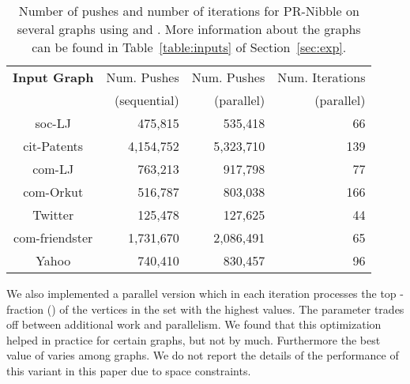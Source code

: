 {\begin{table}
\small
\centering
\begin{tabular}[!t]{c|r|r|r}
{\bf Input Graph} & Num. Pushes & Num. Pushes & Num. Iterations\\
& (sequential) & (parallel) & (parallel) \\
\hline
soc-LJ & 475,815  & 535,418 & 66 \\
cit-Patents & 4,154,752 & 5,323,710 & 139\\
com-LJ & 763,213 & 917,798 & 77\\
com-Orkut & 516,787  & 803,038 & 166 \\
Twitter & 125,478 & 127,625 & 44\\
com-friendster & 1,731,670 & 2,086,491 & 65\\
Yahoo & 740,410 & 830,457& 96 \\
\end{tabular}
\caption{Number of pushes and number of iterations for PR-Nibble on
  several graphs using  and . More
  information about the graphs can be found in
  Table~\ref{table:inputs} of
  Section~\ref{sec:exp}.}\label{table:pr-nibble}
\end{table}
}

We also implemented a parallel version which in each iteration
processes the top -fraction () of the vertices
in the set  with the highest
 values. The  parameter trades off between additional work
and parallelism.  We found that this optimization helped in practice
for certain graphs, but not by much. Furthermore the best value of
 varies among graphs. We do not report the details of the
performance of this variant in this paper due to space constraints.



